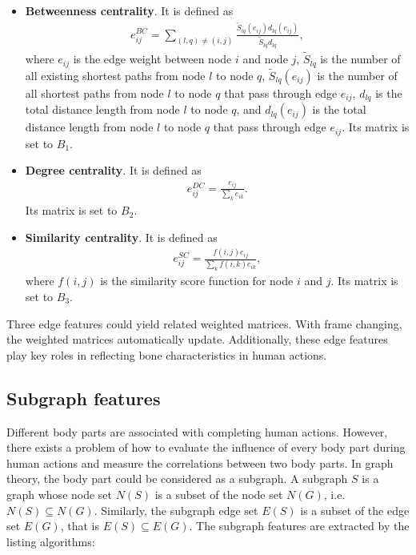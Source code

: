 \documentclass[journal]{IEEEtran}
\begin{document}
\begin{itemize}

    \item \textbf{Betweenness centrality}. It is defined as
        \begin{align}
         e_{ij}^{BC} =\sum_{(l,q) \not= (i,j)}\frac{\widetilde{S}_{lq}(e_{ij}) d_{lq}(e_{ij})}{\widetilde{S}_{lq}d_{lq}},
        \label{eq12}
        \end{align}
        where $e_{ij}$ is the edge weight between node $i$ and node $j$, $\widetilde{S}_{lq}$ is the number of all existing shortest paths from node $l$ to node $q$, $\widetilde{S}_{lq}(e_{ij})$ is the number of all shortest paths from node $l$ to node $q$ that pass through edge $e_{ij}$, $d_{lq}$ is the total distance length from node $l$ to node $q$, and $d_{lq}(e_{ij})$ is the total distance length from node $l$ to node $q$ that pass through edge $e_{ij}$. Its matrix is set to $B_1$.
    \item \textbf{Degree centrality}. It is defined as
        \begin{align}
            e_{ij}^{DC} = \frac{e_{ij}}{\sum_{k}e_{ik}}.
        \label{eq13}
        \end{align}
        Its matrix is set to $B_2$.
    \item \textbf{Similarity centrality}. It is defined as
        \begin{align}
            e_{ij}^{SC} = \frac{f(i,j)e_{ij}}{\sum_{k}f(i,k)e_{ik}},
        \label{eq14}
        \end{align}
    where $f(i,j)$ is the similarity score function for node $i$ and $j$. Its matrix is set to $B_3$.
\end{itemize}

Three edge features could yield related weighted matrices. With frame changing, the weighted matrices automatically update. Additionally, these edge features play key roles in reflecting bone characteristics in human actions.

\subsection{Subgraph features}

Different body parts are associated with completing human actions. However, there exists a problem of how to evaluate the influence of every body part during human actions and measure the correlations between two body parts. In graph theory, the body part could be considered as a subgraph. A subgraph $S$ is a graph whose node set $N(S)$ is a subset of the node set $N(G)$, i.e. $N(S) \subseteq N(G)$. Similarly, the subgraph edge set $E(S)$ is a subset of the edge set $E(G)$, that is $E(S) \subseteq E(G)$. The subgraph features are extracted by the listing algorithms:
\end{document}
